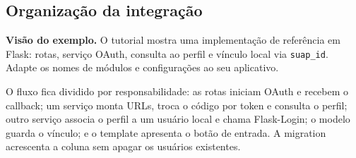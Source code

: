 \documentclass[11pt,a4paper]{article}
\begin{document}
\subsection{Organização da integração}
\noindent\colorbox{azulclaro}{\parbox{\dimexpr\linewidth-2\fboxsep}{\textbf{Visão do exemplo.} O tutorial mostra uma implementação de referência em Flask: rotas, serviço OAuth, consulta ao perfil e vínculo local via \texttt{suap\_id}. Adapte os nomes de módulos e configurações ao seu aplicativo.}}
\medskip
O fluxo fica dividido por responsabilidade: as rotas iniciam OAuth e recebem o callback; um serviço monta URLs, troca o código por token e consulta o perfil; outro serviço associa o perfil a um usuário local e chama Flask-Login; o modelo guarda o vínculo; e o template apresenta o botão de entrada. A migration acrescenta a coluna sem apagar os usuários existentes.
\end{document}
